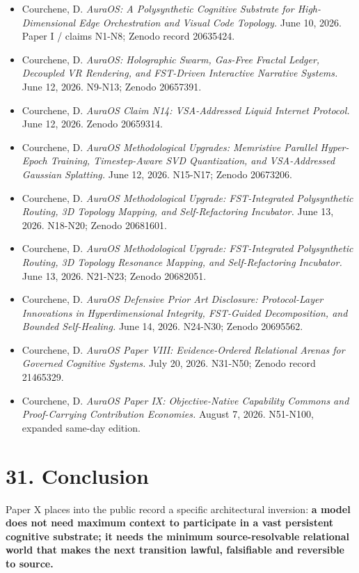 \documentclass[
  10pt,
  letterpaper,
]{article}
\providecommand{\tightlist}{%
  \setlength{\itemsep}{0pt}\setlength{\parskip}{0pt}}
\begin{document}
\begin{itemize}
\tightlist
\item
  Courchene, D. \emph{AuraOS: A Polysynthetic Cognitive Substrate for
  High-Dimensional Edge Orchestration and Visual Code Topology.} June
  10, 2026. Paper I / claims N1-N8; Zenodo record 20635424.
\item
  Courchene, D. \emph{AuraOS: Holographic Swarm, Gas-Free Fractal
  Ledger, Decoupled VR Rendering, and FST-Driven Interactive Narrative
  Systems.} June 12, 2026. N9-N13; Zenodo 20657391.
\item
  Courchene, D. \emph{AuraOS Claim N14: VSA-Addressed Liquid Internet
  Protocol.} June 12, 2026. Zenodo 20659314.
\item
  Courchene, D. \emph{AuraOS Methodological Upgrades: Memristive
  Parallel Hyper-Epoch Training, Timestep-Aware SVD Quantization, and
  VSA-Addressed Gaussian Splatting.} June 12, 2026. N15-N17; Zenodo
  20673206.
\item
  Courchene, D. \emph{AuraOS Methodological Upgrade: FST-Integrated
  Polysynthetic Routing, 3D Topology Mapping, and Self-Refactoring
  Incubator.} June 13, 2026. N18-N20; Zenodo 20681601.
\item
  Courchene, D. \emph{AuraOS Methodological Upgrade: FST-Integrated
  Polysynthetic Routing, 3D Topology Resonance Mapping, and
  Self-Refactoring Incubator.} June 13, 2026. N21-N23; Zenodo 20682051.
\item
  Courchene, D. \emph{AuraOS Defensive Prior Art Disclosure:
  Protocol-Layer Innovations in Hyperdimensional Integrity, FST-Guided
  Decomposition, and Bounded Self-Healing.} June 14, 2026. N24-N30;
  Zenodo 20695562.
\item
  Courchene, D. \emph{AuraOS Paper VIII: Evidence-Ordered Relational
  Arenas for Governed Cognitive Systems.} July 20, 2026. N31-N50; Zenodo
  record 21465329.
\item
  Courchene, D. \emph{AuraOS Paper IX: Objective-Native Capability
  Commons and Proof-Carrying Contribution Economies.} August 7, 2026.
  N51-N100, expanded same-day edition.
\end{itemize}

\section{31. Conclusion}\label{31-conclusion}

Paper X places into the public record a specific architectural
inversion: \textbf{a model does not need maximum context to participate
in a vast persistent cognitive substrate; it needs the minimum
source-resolvable relational world that makes the next transition
lawful, falsifiable and reversible to source.}
\end{document}
